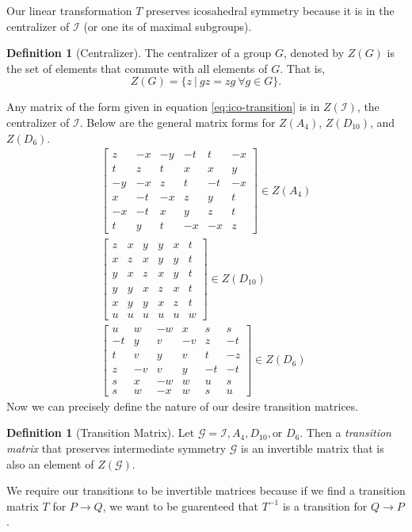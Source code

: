 \documentclass[a4paper,10pt]{article}
\theoremstyle{plain}
\theoremstyle{definition}
\newtheorem{Definition}[Theorem]{Definition}
\theoremstyle{remark}
\begin{document}
Our linear transformation \(T\) preserves icosahedral symmetry because it is in the centralizer of \(\mathcal{I}\) (or one its of maximal subgroups).
\begin{Definition}[Centralizer]
	The centralizer of a group \(G\), denoted by \(Z(G)\) is the set of elements that commute with all elements of \(G\).
	That is, \[Z(G) = \{z\ |\ gz = zg\ \forall g \in G\}.\]
\end{Definition}
Any matrix of the form given in equation \ref{eq:ico-transition} is in \(Z(\mathcal{I})\), the centralizer of \(\mathcal{I}\).
Below are the general matrix forms for \(Z(A_4)\), \(Z(D_{10})\), and \(Z(D_6)\). \cite{indelicatoetal2012}
\begin{align}
	\begin{bmatrix}
		z  & -x & -y & -t & t  & -x \\
		t  & z  & t  & x  & x  & y  \\
		-y & -x & z  & t  & -t & -x \\
		x  & -t & -x & z  & y  & t  \\
		-x & -t & x  & y  & z  & t  \\
		t  & y  & t  & -x & -x & z
	\end{bmatrix} \in Z(A_4) \\
	\begin{bmatrix}
		z & x & y & y & x & t \\
		x & z & x & y & y & t \\
		y & x & z & x & y & t \\
		y & y & x & z & x & t \\
		x & y & y & x & z & t \\
		u & u & u & u & u & w
	\end{bmatrix} \in Z(D_{10}) \\
	\begin{bmatrix}
		u  & w  & -w & x  & s  & s  \\
		-t & y  & v  & -v & z  & -t \\
		t  & v  & y  & v  & t  & -z \\
		z  & -v & v  & y  & -t & -t \\
		s  & x  & -w & w  & u  & s  \\
		s  & w  & -x & w  & s  & u
	\end{bmatrix} \in Z(D_{6})
\end{align}
Now we can precisely define the nature of our desire transition matrices.
\begin{Definition}[Transition Matrix]
	Let \(\mathcal{G} = \mathcal{I}, A_4, D_{10}, \text{or } D_6\).
	Then a \emph{transition matrix} that preserves intermediate symmetry \( \mathcal{G} \) is an invertible matrix that is also an element of \( Z(\mathcal{G}) \).
\end{Definition}
We require our transitions to be invertible matrices because if we find a transition matrix \( T \) for \( P \to Q \), we want to be guarenteed that \( T^{-1} \) is a transition for \( Q \to P \).
\end{document}
